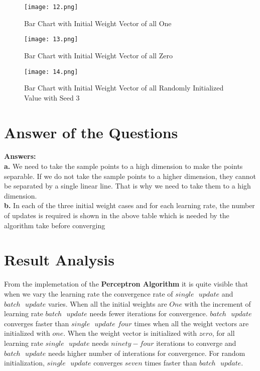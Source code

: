 \documentclass[conference]{IEEEtran}
\begin{document}
\begin{itemize}
\begin{figure}[htbp]
\centerline{\texttt{[image: 12.png]}}
\caption{Bar Chart with Initial Weight Vector of all One}
\label{fig}
\end{figure}

\begin{figure}[htbp]
\centerline{\texttt{[image: 13.png]}}
\caption{Bar Chart with Initial Weight Vector of all Zero}
\label{fig}
\end{figure}

\begin{figure}[htbp]
\centerline{\texttt{[image: 14.png]}}
\caption{Bar Chart with Initial Weight Vector of all Randomly Initialized Value with Seed 3}
\label{fig}
\end{figure}
\end{itemize}

\section{Answer of the Questions}
\textbf{Answers:}\\
\textbf{a.} We need to take the sample points to a high dimension to make the points separable. If we do not take the sample points to a higher dimension, they cannot be separated by a single linear line. That is why we need to take them to a high dimension.\\
\textbf{b.} In each of the three initial weight cases and for each learning rate, the number of updates is required is shown in the above table which is needed by the algorithm take before converging\\




\section{Result Analysis}
From the implemetation of the \textbf{Perceptron Algorithm} it is quite visible that when we vary the learning rate the convergence rate of $single \textrm{   }update$ and $batch\textrm{   } update$ varies. When all the initial weights are $One$ with the increment of learning rate $batch\textrm{   } update$ needs fewer iterations for convergence. $batch\textrm{   } update$ converges faster than
$single \textrm{   }update$ $four$ times when all the weight vectors are initialized with $one$. When the weight vector is initialized with $zero$, for all learning rate  $single \textrm{   }update$ needs $ninety-four$ iterations to converge and $batch\textrm{   } update$ needs higher number of interations for convergence. For random initialization, $single \textrm{   }update$ converges $seven$ times faster than $batch\textrm{   } update.$
\end{document}

